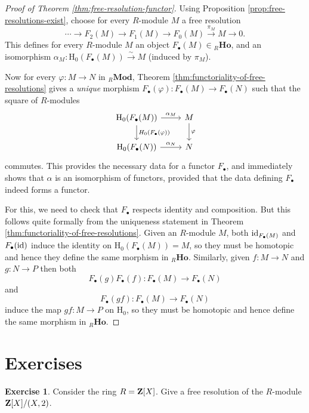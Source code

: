 \documentclass[11pt]{amsbook}
\newcommand{\isomto}{\overset{\sim}{\to}}
\newcommand{\longto}{\longrightarrow}
\DeclareMathOperator\Mod{{\bf{Mod}}}
\def\rH{{\mathrm H}} \def\rK{{\mathrm K}} \def\rR{{\mathrm R}}
\def\id{{\rm id}}
\def\Mod{\mathbf{Mod}}
\def\Ho{\mathbf{Ho}}
\theoremstyle{plain}
\theoremstyle{definition}
\newtheorem{exercise}{Exercise}
\begin{document}
\begin{proof}[Proof of Theorem \ref{thm:free-resolution-functor}]
Using Proposition \ref{prop:free-resolutions-exist}, choose for every $R$-module $M$  a free resolution
\[
	\cdots \longto F_2(M) \longto F_1(M) \longto F_0(M) \overset{\pi_M} \longto M \longto 0.
\]
This defines for every $R$-module $M$ an object $F_\bullet(M) \in {}_R\Ho$, and an isomorphism
$\alpha_M\colon \rH_0(F_\bullet(M)) \isomto M$ (induced by $\pi_M$).

Now for every $\varphi\colon M\to N$ in ${}_R\Mod$, Theorem \ref{thm:functoriality-of-free-resolutions} gives
a \emph{unique} morphism $F_\bullet(\varphi) \colon F_\bullet(M) \to F_\bullet(N)$ such that the square
of $R$-modules
\[
\begin{tikzcd}
\rH_0(F_\bullet(M)) \arrow{r}{\alpha_M} \arrow{d}{H_0(F_\bullet(\varphi))} & M \arrow{d}{\varphi} \\
\rH_0(F_\bullet(N)) \arrow{r}{\alpha_N} & N
\end{tikzcd}
\]
commutes. This provides the necessary data for a functor $F_\bullet$, and immediately shows that $\alpha$ is an isomorphism of functors, provided that the data defining $F_\bullet$ indeed forms a functor.

For this, we need to check that $F_\bullet$ respects identity and composition. But this follows quite formally from the uniqueness statement in Theorem \ref{thm:functoriality-of-free-resolutions}. Given an $R$-module $M$, both $\id_{F_\bullet(M)}$ and $F_\bullet(\id)$ induce the identity on $\rH_0(F_\bullet(M))=M$, so they must be homotopic and hence they define the same morphism in ${}_R\Ho$. Similarly, given $f\colon M\to N$ and $g\colon N\to P$ then both
\[
	F_\bullet(g) F_\bullet(f)\colon F_\bullet(M) \to F_\bullet(N)
\]
and
\[
	F_\bullet(gf)\colon F_\bullet(M) \to F_\bullet(N)
\]
induce the map $gf\colon M\to P$ on $\rH_0$, so they must be homotopic and hence define the same morphism in ${}_R\Ho$.
\end{proof}



\newpage
\section*{Exercises}

\begin{exercise}
Consider the ring $R={\mathbf{Z}}[X]$. Give a free resolution of the $R$-module ${\mathbf{Z}}[X]/(X,2)$.
\end{exercise}
\end{document}
